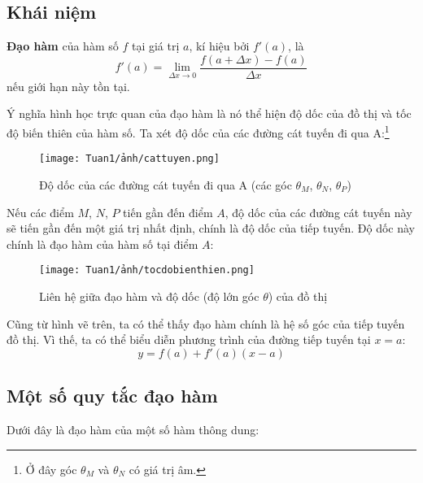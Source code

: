 \subsection{Khái niệm}
\begin{definition}
\textbf{Đạo hàm} của hàm số $f$ tại giá trị $a$, kí hiệu bởi $f'(a)$, là
    \begin{equation}
        f'(a)=\lim_{\Delta x\rightarrow 0}\frac{f(a+\Delta x)-f(a)}{\Delta x}
    \end{equation}
nếu giới hạn này tồn tại.
\end{definition}

Ý nghĩa hình học trực quan của đạo hàm là nó thể hiện độ dốc của đồ thị và tốc độ biến thiên của hàm số. Ta xét độ dốc của các đường cát tuyến đi qua A:\footnote{Ở đây góc $\theta_M$ và $\theta_N$ có giá trị âm.}
\begin{figure}[H]
\centering 
\texttt{[image: Tuan1/ảnh/cattuyen.png]}
\caption{Độ dốc của các đường cát tuyến đi qua A (các góc $\theta_M$, $\theta_N$, $\theta_P$)}
\end{figure}

Nếu các điểm $M$, $N$, $P$ tiến gần đến điểm $A$, độ dốc của các đường cát tuyến này sẽ tiến gần đến một giá trị nhất định, chính là độ dốc của tiếp tuyến. Độ dốc này chính là đạo hàm của hàm số tại điểm $A$:
\begin{figure}[H]
\centering
\texttt{[image: Tuan1/ảnh/tocdobienthien.png]}
\caption{Liên hệ giữa đạo hàm và độ dốc (độ lớn góc $\theta$) của đồ thị}
\end{figure}

Cũng từ hình vẽ trên, ta có thể thấy đạo hàm chính là hệ số góc của tiếp tuyến đồ thị. Vì thế, ta có thể biểu diễn phương trình của đường tiếp tuyến tại $x=a$:
\begin{equation}
    y=f(a)+f'(a)(x-a)
\end{equation}



\subsection{Một số quy tắc đạo hàm}
Dưới đây là đạo hàm của một số hàm thông dung:

